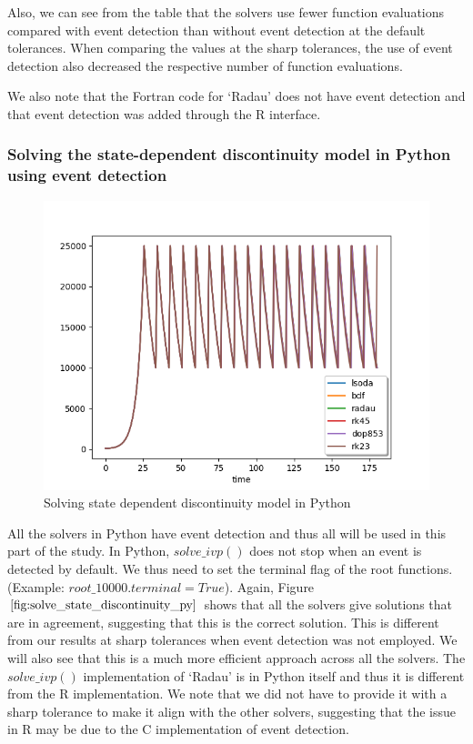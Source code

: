 Also, we can see from the table that the solvers use fewer function evaluations compared with event detection than without event detection at the default tolerances. When comparing the values at the sharp tolerances, the use of event detection also decreased the respective number of function evaluations.

We also note that the Fortran code for `Radau' does not have event detection and that event detection was added through the R interface.

\subsubsection{Solving the state-dependent discontinuity model in Python using event detection}
\begin{figure}[H]
\centering
\includegraphics[width=0.7\linewidth]{./figures/solve_state_discontinuity_py}
\caption{Solving state dependent discontinuity model in Python}
\label{fig:solve_state_discontinuity_py}
\end{figure}
All the solvers in Python have event detection and thus all will be used in this part of the study. In Python, $solve\_ivp()$ does not stop when an event is detected by default. We thus need to set the terminal flag of the root functions.
(Example: $root\_10000.terminal = True$).
Again, Figure $\ref{fig:solve_state_discontinuity_py}$ shows that all the solvers give solutions that are in agreement, suggesting that this is the correct solution. This is different from our results at sharp tolerances when event detection was not employed. We will also see that this is a much more efficient approach across all the solvers. The $solve\_ivp()$ implementation of `Radau' is in Python itself and thus it is different from the R implementation. We note that we did not have to provide it with a sharp tolerance to make it align with the other solvers, suggesting that the issue in R may be due to the C implementation of event detection.

